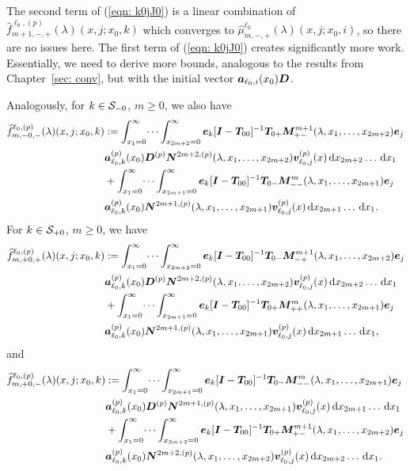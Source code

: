 The second term of (\ref{eqn: k0jJ0}) is a linear combination of \(\widehat{f}_{m+1,-,+}^{\ell_0,(p)}(\lambda)(x,j;x_0,k)\) which converges to \(\widehat \mu_{m,-,+}^{\ell_0}(\lambda)(x,j;x_0,i)\), so there are no issues here. The first term of (\ref{eqn: k0jJ0}) creates significantly more work. Essentially, we need to derive more bounds, analogous to the results from Chapter~\ref{sec: conv}, but with the initial vector \(\boldsymbol a_{\ell_0,i}(x_0)\boldsymbol D\). 

Analogously, for \(k\in\mathcal{S}_{-0}\), \(m\geq 0\), we also have 
\begin{align*}
	\widehat{f}_{m,-0,-}^{\ell_0,(p)}(\lambda)(x,j;x_0,k)\nonumber 
	&:=\int_{x_1=0}^\infty \dots \int_{x_{2m+2}=0}^\infty  \boldsymbol e_k [\boldsymbol I - \boldsymbol T_{00}]^{-1}\boldsymbol T_{0+} \boldsymbol M^{m+1}_{+-}(\lambda,x_1,\dots,x_{2m+2})\boldsymbol e_j \nonumber
	\\& \boldsymbol a_{\ell_0,k}^{(p)}(x_0) \boldsymbol D^{(p)} \boldsymbol N^{2m+2,(p)}(\lambda,x_1,\dots,x_{2m+2}) {\boldsymbol v}_{\ell_0,j}^{(p)}(x)\, \mathrm{d} x_{2m+2}\dots  \, \mathrm{d} x_1  \nonumber
	\\& + \int_{x_1=0}^\infty \dots \int_{x_{2m+1}=0}^\infty  \boldsymbol e_k [\boldsymbol I - \boldsymbol T_{00}]^{-1}\boldsymbol T_{0-} \boldsymbol M^{m}_{--}(\lambda,x_1,\dots,x_{2m+1})\boldsymbol e_j \nonumber
	\\& \boldsymbol a_{\ell_0,k}^{(p)}(x_0)\boldsymbol N^{2m+1,(p)}(\lambda,x_1,\dots,x_{2m+1}) {\boldsymbol v}_{\ell_0,j}^{(p)}(x)\, \mathrm{d} x_{2m+1}\dots\, \mathrm{d} x_1.
\end{align*}
For \(k\in\mathcal{S}_{+0}\), \(m\geq 0\), we have 
\begin{align*}
	\widehat{f}_{m,+0,+}^{\ell_0,(p)}(\lambda)(x,j;x_0,k)\nonumber 
	&:=\int_{x_1=0}^\infty \dots \int_{x_{2m+2}=0}^\infty \boldsymbol e_k [\boldsymbol I - \boldsymbol T_{00}]^{-1}\boldsymbol T_{0-} \boldsymbol M^{m+1}_{-+}(\lambda,x_1,\dots,x_{2m+2})\boldsymbol e_j \nonumber
	\\& \boldsymbol a_{\ell_0,k}^{(p)}(x_0) \boldsymbol D^{(p)} \boldsymbol N^{2m+2,(p)}(\lambda,x_1,\dots,x_{2m+2}) {\boldsymbol v}_{\ell_0,j}^{(p)}(x)\, \mathrm{d} x_{2m+2}\dots  \, \mathrm{d} x_1  \nonumber
	\\& + \int_{x_1=0}^\infty \dots \int_{x_{2m+1}=0}^\infty  \boldsymbol e_k [\boldsymbol I - \boldsymbol T_{00}]^{-1}\boldsymbol T_{0+} \boldsymbol M^m_{++}(\lambda,x_1,\dots,x_{2m+1})\boldsymbol e_j \nonumber
	\\& \boldsymbol a_{\ell_0,k}^{(p)}(x_0)\boldsymbol N^{2m+1,(p)}(\lambda,x_1,\dots,x_{2m+1}) {\boldsymbol v}_{\ell_0,j}^{(p)}(x)\, \mathrm{d} x_{2m+1}\dots  \, \mathrm{d} x_1,
\end{align*}
and 
\begin{align*}
	\widehat{f}_{m,+0,-}^{\ell_0,(p)}(\lambda)(x,j;x_0,k)\nonumber 
	&:=\int_{x_1=0}^\infty \dots \int_{x_{2m+1}=0}^\infty  \boldsymbol e_k [\boldsymbol I - \boldsymbol T_{00}]^{-1}\boldsymbol T_{0-} \boldsymbol M^m_{--}(\lambda,x_1,\dots,x_{2m+1})\boldsymbol e_j \nonumber
	\\& \boldsymbol a_{\ell_0,k}^{(p)}(x_0) \boldsymbol D^{(p)} \boldsymbol N^{2m+1,(p)}(\lambda,x_1,\dots,x_{2m+1}) {\boldsymbol v}_{\ell_0,j}^{(p)}(x)\, \mathrm{d} x_{2m+1}\dots  \, \mathrm{d} x_1  \nonumber
	\\& + \int_{x_1=0}^\infty \dots \int_{x_{2m+2}=0}^\infty  \boldsymbol e_k [\boldsymbol I - \boldsymbol T_{00}]^{-1}\boldsymbol T_{0+} \boldsymbol M^{m+1}_{+-}(\lambda,x_1,\dots,x_{2m+2})\boldsymbol e_j \nonumber
	\\& \boldsymbol a_{\ell_0,k}^{(p)}(x_0)\boldsymbol N^{2m+2,(p)}(\lambda,x_1,\dots,x_{2m+2}) {\boldsymbol v}_{\ell_0,j}^{(p)}(x)\, \mathrm{d} x_{2m+2}\dots  \, \mathrm{d} x_1.
\end{align*}
